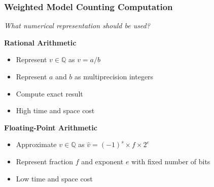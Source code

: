 \documentclass[t,pdf]{beamer}
\newcommand{\bitem}{\item[$\bullet$]}
\newcommand{\approximate}[1]{\hat{#1}}
\newcommand{\approxv}{\approximate{v}}
\begin{document}
\begin{frame}
  \frametitle{Weighted Model Counting Computation}

\begin{center}
  \Large \emph{What numerical representation should be used?}
\end{center}

\bigskip
\begin{minipage}[t]{0.48\textwidth}
{\bf Rational Arithmetic}
\begin{itemize}
  \bitem Represent $v \in \mathbb{Q}$ as $v = a/b$
  \bitem Represent $a$ and $b$ as multiprecision integers
  \bitem Compute exact result
  \bitem High time and space cost
\end{itemize}
\end{minipage}
\begin{minipage}[t]{0.48\textwidth}
{\bf Floating-Point Arithmetic}
\begin{itemize}
  \bitem Approximate $v \in \mathbb{Q}$ as $\approxv = (-1)^s \times f \times 2^{e}$
  \bitem Represent fraction $f$ and exponent $e$ with fixed number of bits
  \bitem Low time and space cost
\end{itemize}
\end{minipage}

\bigskip
{}

\end{frame}
\end{document}
